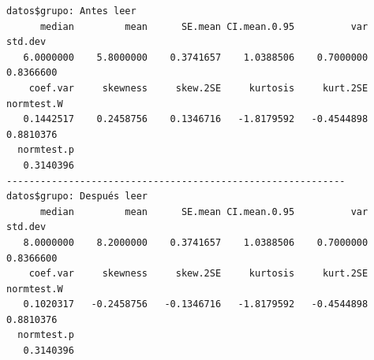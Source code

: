 \documentclass[
  ignorenonframetext,
]{beamer}
\newenvironment{Shaded}{\begin{snugshade}}{\end{snugshade}}
\newcommand{\AttributeTok}[1]{\textcolor[rgb]{0.40,0.45,0.13}{#1}}
\newcommand{\CommentTok}[1]{\textcolor[rgb]{0.37,0.37,0.37}{#1}}
\newcommand{\ConstantTok}[1]{\textcolor[rgb]{0.56,0.35,0.01}{#1}}
\newcommand{\DecValTok}[1]{\textcolor[rgb]{0.68,0.00,0.00}{#1}}
\newcommand{\FunctionTok}[1]{\textcolor[rgb]{0.28,0.35,0.67}{#1}}
\newcommand{\NormalTok}[1]{\textcolor[rgb]{0.00,0.23,0.31}{#1}}
\newcommand{\OtherTok}[1]{\textcolor[rgb]{0.00,0.23,0.31}{#1}}
\newcommand{\SpecialCharTok}[1]{\textcolor[rgb]{0.37,0.37,0.37}{#1}}
\newcommand{\StringTok}[1]{\textcolor[rgb]{0.13,0.47,0.30}{#1}}
\begin{document}
\begin{frame}[fragile]
\begin{Shaded}
\end{Shaded}

\begin{verbatim}
datos$grupo: Antes leer
      median         mean      SE.mean CI.mean.0.95          var      std.dev 
   6.0000000    5.8000000    0.3741657    1.0388506    0.7000000    0.8366600 
    coef.var     skewness     skew.2SE     kurtosis     kurt.2SE   normtest.W 
   0.1442517    0.2458756    0.1346716   -1.8179592   -0.4544898    0.8810376 
  normtest.p 
   0.3140396 
------------------------------------------------------------ 
datos$grupo: Después leer
      median         mean      SE.mean CI.mean.0.95          var      std.dev 
   8.0000000    8.2000000    0.3741657    1.0388506    0.7000000    0.8366600 
    coef.var     skewness     skew.2SE     kurtosis     kurt.2SE   normtest.W 
   0.1020317   -0.2458756   -0.1346716   -1.8179592   -0.4544898    0.8810376 
  normtest.p 
   0.3140396 
\end{verbatim}

\begin{Shaded}
\end{Shaded}
\end{frame}
\end{document}
